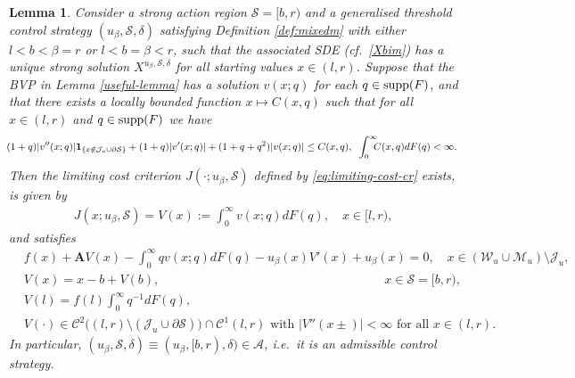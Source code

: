 \documentclass[11pt]{article} %
\newtheorem{lemma}[theorem]{Lemma}
\numberwithin{komcounter}{section}
\begin{document}
\begin{lemma} \label{useful-lemma-2} 
Consider a strong action region $\mathcal{S}=[b,r)$ and a generalised threshold control strategy $(u_\beta,\mathcal{S},\delta)$ satisfying Definition \ref{def:mixedm} with either $l<b<\beta=r$ or $l<b=\beta<r$, such that the associated SDE (cf.~\eqref{Xbim}) has a unique strong solution $X^{u_\beta,\mathcal{S},\delta}$ for all starting values $x \in (l,r)$. 
Suppose that the BVP in Lemma \ref{useful-lemma} has a solution $v(x;q)$ for each $q \in {\rm supp}(F)$, and that there exists a locally bounded function $x \mapsto C(x,q)$ such that for all $x\in (l,r)$ and $q\in {\rm supp}(F)$ we have
\begin{align}\label{hlq3hjl} 
\hspace{-1mm}(1+q)|v''(x;q)|  {\bf 1}_{\{x\not\in \mathcal{J}_u\cup \partial\mathcal{S}\}} 
+ (1+q)|v'(x;q)| 
+ (1+q+q^2)|v(x;q)| 
\leq C(x,q) 
, \;\; 
\int_0^\infty \hspace{-2mm}C(x,q)dF(q)<\infty.
\end{align}
Then the limiting cost criterion $J(\cdot;u_\beta,\mathcal{S})$ defined by \eqref{eq:limiting-cost-cr} exists, is given by  
\begin{align}\label{J=J} 
J(x;u_\beta,\mathcal{S}) 
= V(x) :=\int_0^\infty v(x;q)dF(q), 
\quad x \in [l,r),
\end{align} 
and satisfies 
\begin{align}
&f(x) + \mathbf{A} V(x) - \textstyle{\int_{0}^{\infty}} q v(x;q) dF(q) - u_\beta(x) V'(x) + u_\beta(x) = 0, \quad x \in (\mathcal{W}_u \cup \mathcal{M}_u) \setminus \mathcal{J}_u, 
\label{JBVPa}\\ 
&V(x) = x - b + V(b), \qquad \qquad \qquad \qquad \qquad \qquad \qquad \qquad \qquad x \in \mathcal{S}=[b,r), 
\label{JBVPb}\\
&V(l) = f(l) \textstyle{\int_0^\infty} q^{-1} dF(q), 
\label{JBVPc}\\
& \text{$V(\cdot)\in \mathcal{C}^2\big( (l,r) \setminus (\mathcal{J}_u\cup \partial\mathcal{S}) \big) \cap \mathcal{C}^1(l,r)$ with $|V''(x\pm)|<\infty$ for all $x\in (l,r)$.
}\label{JBVPd}
\end{align}
In particular, $(u_\beta,\mathcal{S},\delta) \equiv (u_\beta,[b,r),\delta) \in \mathcal{A}$, i.e.~it is an admissible control strategy.
\end{lemma}
\end{document}
